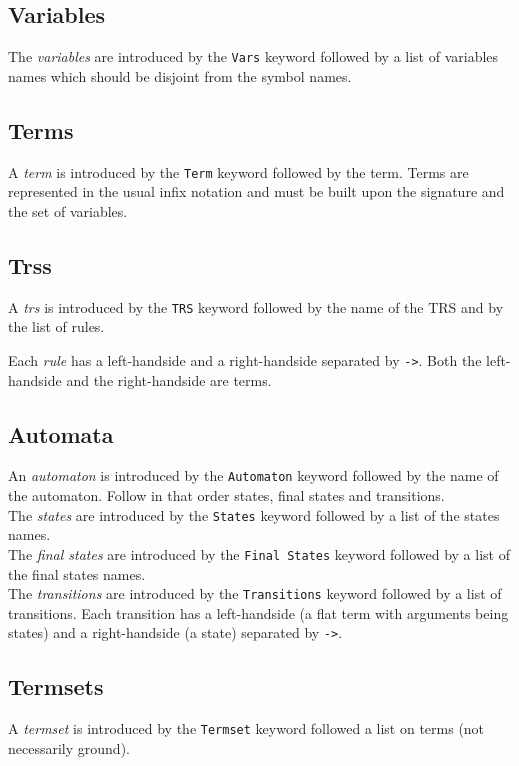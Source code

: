 \documentclass[11pt]{llncs}
\begin{document}
\subsection{Variables}
The \emph{variables} are introduced by the \texttt{Vars} keyword followed by
a list of variables names which should be disjoint from the
symbol names.

\subsection{Terms}
A \emph{term} is introduced by the \texttt{Term} keyword followed by the term.
Terms are represented in the usual infix notation and
must be built upon the signature and the set of variables.

\subsection{Trss}
A \emph{trs} is introduced by the \texttt{TRS} keyword followed
by the name of the TRS and by the list of rules.

Each \emph{rule} has a left-handside and a right-handside separated
by \verb+->+. Both the left-handside and the right-handside
are terms.

\subsection{Automata}
An \emph{automaton} is introduced by the \texttt{Automaton} keyword followed
by the name of the automaton. Follow in that order states,
final states and transitions.\\
%
The \emph{states} are introduced by the \texttt{States} keyword followed
by a list of the states names.\\
%
The \emph{final states} are introduced by the \texttt{Final States} keyword 
followed by a list of the final states names.\\
%
The \emph{transitions} are introduced by the \texttt{Transitions} keyword 
followed
by a list of transitions.
Each transition has a left-handside (a flat term with arguments
being states) and a right-handside (a state) separated by \verb+->+.

\subsection{Termsets}
A \emph{termset} is introduced by the \texttt{Termset} keyword followed
a list on terms (not necessarily ground).
\end{document}
